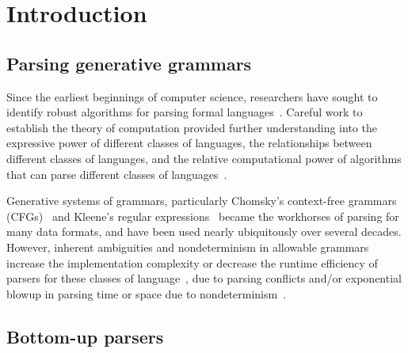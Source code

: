 \documentclass[manuscript,screen]{acmart}
\begin{document}


\maketitle

\section{Introduction}

\subsection{Parsing generative grammars}

Since the earliest beginnings of computer science, researchers have sought to identify robust algorithms for parsing formal languages~\citep{aho1972,aho2006}. Careful work to establish the theory of computation provided further understanding into the expressive power of different classes of languages, the relationships between different classes of languages, and the relative computational power of algorithms that can parse different classes of languages~\citep{sipser2012}.

Generative systems of grammars, particularly Chomsky's context-free grammars (CFGs)~\citep{chomsky1956} and Kleene's regular expressions~\citep{kleene1951} became the workhorses of parsing for many data formats, and have been used nearly ubiquitously over several decades. However, inherent ambiguities and nondeterminism in allowable grammars increase the implementation complexity or decrease the runtime efficiency of parsers for these classes of language~\citep{lang1974,tomita2013}, due to parsing conflicts and/or exponential blowup in parsing time or space due to nondeterminism~\citep{kleene1951,mcnaughton1960}.

\subsection{Bottom-up parsers}
\end{document}
